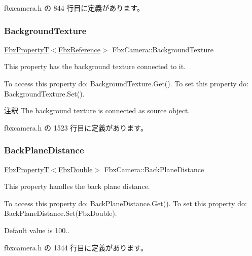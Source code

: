  fbxcamera.\+h の 844 行目に定義があります。

\mbox{\label{class_fbx_camera_a23d1fddeed7661a66461fbe0f27cedde}} 
\subsubsection{\texorpdfstring{Background\+Texture}{BackgroundTexture}}
{\footnotesize\ttfamily \hyperlink{class_fbx_property_t}{Fbx\+PropertyT}$<$\hyperlink{fbxtypes_8h_a44df6a2eec915cf27cd481e5c5e48a24}{Fbx\+Reference}$>$ Fbx\+Camera\+::\+Background\+Texture}

This property has the background texture connected to it.

To access this property do\+: Background\+Texture.\+Get(). To set this property do\+: Background\+Texture.\+Set().

\begin{DoxyRemark}{注釈}
The background texture is connected as source object. 
\end{DoxyRemark}


 fbxcamera.\+h の 1523 行目に定義があります。

\mbox{\label{class_fbx_camera_ad54b41219ffef6383e75197300210f75}} 
\subsubsection{\texorpdfstring{Back\+Plane\+Distance}{BackPlaneDistance}}
{\footnotesize\ttfamily \hyperlink{class_fbx_property_t}{Fbx\+PropertyT}$<$\hyperlink{fbxtypes_8h_a171e72a1c46fc15c1a6c9c31948c1c5b}{Fbx\+Double}$>$ Fbx\+Camera\+::\+Back\+Plane\+Distance}

This property handles the back plane distance.

To access this property do\+: Back\+Plane\+Distance.\+Get(). To set this property do\+: Back\+Plane\+Distance.\+Set(\+Fbx\+Double).

Default value is 100.. 

 fbxcamera.\+h の 1344 行目に定義があります。

\mbox{\label{class_fbx_camera_ae12c26a9d3be06c3e118cef04f596224}} 

